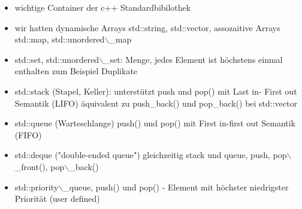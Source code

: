 \documentclass[a4paper]{scrartcl}
\theoremstyle{definition}
\theoremstyle{plain}
\theoremstyle{remark}
\theoremstyle{remark}
\begin{document}
\begin{itemize}
\item wichtige Container der c++ Standardbibilothek
\item wir hatten dynamische Arrays std::string, std::vector, assozaitive Arrays std::map, std::unordered$\backslash$\_map
\item std::set, std::unordered$\backslash$\_set: Menge, jedes Element ist höchstens einmal enthalten zum Beispiel Duplikate
\item std::stack (Stapel, Keller): unterstützt push und pop() mit Last in- First out Semantik (LIFO) äquivalent zu push\_back() und pop\_back() bei std::vector
\item std::queue (Warteschlange) push() und pop() mit First in-first out Semantik (FIFO)
\item std::deque ("double-ended queue") gleichzeitig stack und queue, push, pop$\backslash$\_front(), pop$\backslash$\_back()
\item std::priority$\backslash$\_queue, push() und pop() - Element mit höchster niedrigster Priorität (user defined)
\end{itemize}
\end{document}
